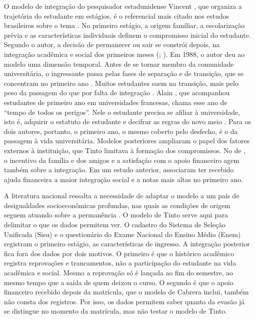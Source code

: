 \documentclass[12pt,a4paper]{article}
\begin{document}
O modelo de integração do pesquisador estadunidense Vincent \citet{tintoDropoutHigherEducation1975}, que organiza a trajetória do estudante em estágios, é o referencial mais citado nos estudos brasileiros sobre o tema \citep{starkEvasaoNoEnsino2025}. No primeiro estágio, a origem familiar, a escolarização prévia e as características individuais definem o compromisso inicial do estudante. Segundo o autor, a decisão de permanecer ou sair se constrói depois, na integração acadêmica e social dos primeiros meses (\citealp[p.~8]{tinto1982defining}; \citealp{pinheiroModelosTeoricosEvasao2023,pradoPermanenciaNaEducacao2022}). Em 1988, o autor deu ao modelo uma dimensão temporal. Antes de se tornar membro da comunidade universitária, o ingressante passa pelas fases de separação e de transição, que se concentram no primeiro ano \citep[pp.~445, 451]{tinto1988stages}. Muitos estudantes saem na transição, mais pelo peso da passagem do que por falta de integração \citep[p.~444]{tinto1988stages}. Alain \citet[p.~1243]{coulon2017oficio}, que acompanhou estudantes de primeiro ano em universidades francesas, chama esse ano de ``tempo de todos os perigos''. Nele o estudante precisa se afiliar à universidade, isto é, adquirir o estatuto de estudante e decifrar as regras do novo meio \citep[p.~1247]{coulon2017oficio}. Para os dois autores, portanto, o primeiro ano, o mesmo coberto pelo desfecho, é o da passagem à vida universitária. Modelos posteriores ampliaram o papel dos fatores externos à instituição, que Tinto limitava à formação dos compromissos. No de \citet[pp.~132--135]{cabrera1993college}, o incentivo da família e dos amigos e a satisfação com o apoio financeiro agem também sobre a integração. Em um estudo anterior, \citet{cabrera1992role} associaram ter recebido ajuda financeira a maior integração social e a notas mais altas no primeiro ano.

A literatura nacional ressalta a necessidade de adaptar o modelo a um país de desigualdades socioeconômicas profundas, nas quais as condições de origem seguem atuando sobre a permanência \citep{pinheiroModelosTeoricosEvasao2023}. O modelo de Tinto serve aqui para delimitar o que os dados permitem ver. O cadastro do Sistema de Seleção Unificada (Sisu) e o questionário do Exame Nacional do Ensino Médio (Enem) registram o primeiro estágio, as características de ingresso. A integração posterior fica fora dos dados por dois motivos. O primeiro é que o histórico acadêmico registra reprovações e trancamentos, não a participação do estudante na vida acadêmica e social. Mesmo a reprovação só é lançada ao fim do semestre, ao mesmo tempo que a saída de quem deixou o curso. O segundo é que o apoio financeiro recebido depois da matrícula, que o modelo de Cabrera inclui, também não consta dos registros. Por isso, os dados permitem saber quanto da evasão já se distingue no momento da matrícula, mas não testar o modelo de Tinto.
\end{document}
